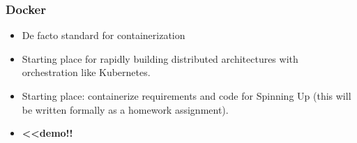 \documentclass{beamer}
\begin{document}
\begin{frame}
  \frametitle{Docker}
  \begin{itemize}
  \item De facto standard for containerization
  \item Starting place for rapidly building distributed architectures with orchestration like
    Kubernetes.
  \item Starting place: containerize requirements and code for Spinning Up (this will be
    written formally as a homework assignment).
  \item {\bf <<demo!! }
  \end{itemize}
\end{frame}
\end{document}
